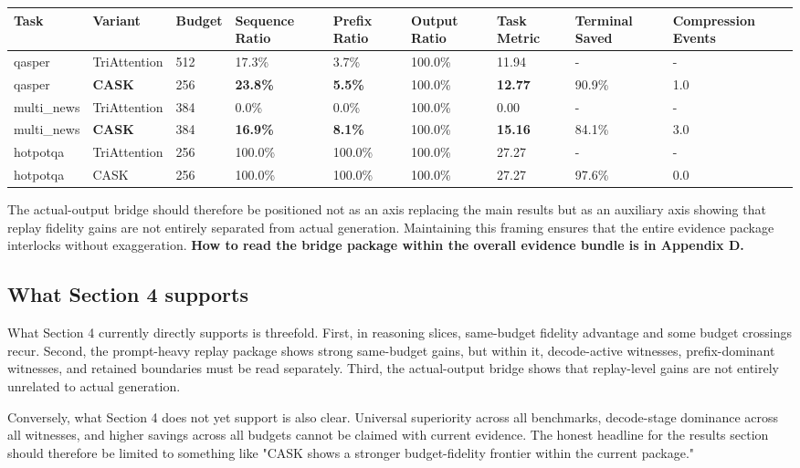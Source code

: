 \begin{table}[H]
\centering
\small
\begin{tabularx}{\textwidth}{YYYYYYYYY}
\toprule
Task & Variant & Budget & Sequence Ratio & Prefix Ratio & Output Ratio & Task Metric & Terminal Saved & Compression Events \\
\midrule
qasper & TriAttention & 512 & 17.3\% & 3.7\% & 100.0\% & 11.94 & - & - \\
qasper & \textbf{CASK} & 256 & \textbf{23.8\%} & \textbf{5.5\%} & 100.0\% & \textbf{12.77} & 90.9\% & 1.0 \\
multi\_news & TriAttention & 384 & 0.0\% & 0.0\% & 100.0\% & 0.00 & - & - \\
multi\_news & \textbf{CASK} & 384 & \textbf{16.9\%} & \textbf{8.1\%} & 100.0\% & \textbf{15.16} & 84.1\% & 3.0 \\
hotpotqa & TriAttention & 256 & 100.0\% & 100.0\% & 100.0\% & 27.27 & - & - \\
hotpotqa & CASK & 256 & 100.0\% & 100.0\% & 100.0\% & 27.27 & 97.6\% & 0.0 \\
\bottomrule
\end{tabularx}
\end{table}


The actual-output bridge should therefore be positioned not as an axis replacing the main results but as an auxiliary axis showing that replay fidelity gains are not entirely separated from actual generation. Maintaining this framing ensures that the entire evidence package interlocks without exaggeration. \textbf{How to read the bridge package within the overall evidence bundle is in Appendix D.}


\subsection{What Section 4 supports}


What Section 4 currently directly supports is threefold. First, in reasoning slices, same-budget fidelity advantage and some budget crossings recur. Second, the prompt-heavy replay package shows strong same-budget gains, but within it, decode-active witnesses, prefix-dominant witnesses, and retained boundaries must be read separately. Third, the actual-output bridge shows that replay-level gains are not entirely unrelated to actual generation.


Conversely, what Section 4 does not yet support is also clear. Universal superiority across all benchmarks, decode-stage dominance across all witnesses, and higher savings across all budgets cannot be claimed with current evidence. The honest headline for the results section should therefore be limited to something like "CASK shows a stronger budget-fidelity frontier within the current package."


